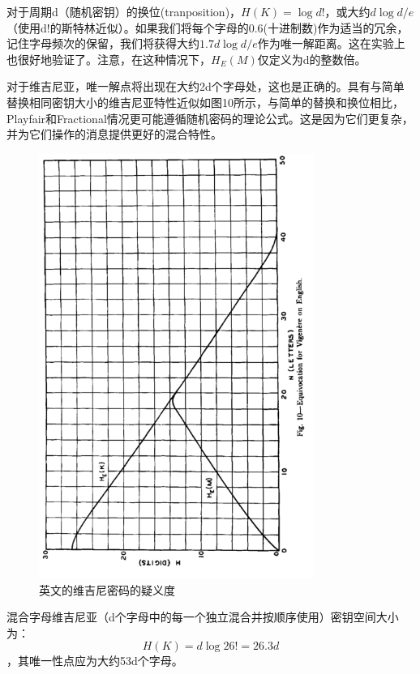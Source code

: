 \documentclass[]{article}
\begin{document}
对于周期d（随机密钥）的换位(tranposition)，$H(K)=\log{d!}$，或大约$d\log{d/e}$（使用d!的斯特林近似）。如果我们将每个字母的0.6(十进制数)作为适当的冗余，记住字母频次的保留，我们将获得大约$1.7d\log{d/e}$作为唯一解距离。这在实验上也很好地验证了。注意，在这种情况下，$H_E(M)$仅定义为d的整数倍。

对于维吉尼亚，唯一解点将出现在大约2d个字母处，这也是正确的。具有与简单替换相同密钥大小的维吉尼亚特性近似如图10所示，与简单的替换和换位相比，Playfair和Fractional情况更可能遵循随机密码的理论公式。这是因为它们更复杂，并为它们操作的消息提供更好的混合特性。

\begin{figure}[htbp]
	\centering
	\includegraphics[width=0.8\textwidth]{fig10.png}
	\caption{英文的维吉尼密码的疑义度}
	\label{fig:fig10}
\end{figure}

混合字母维吉尼亚（d个字母中的每一个独立混合并按顺序使用）密钥空间大小为：
\[H(K)=d\log{26!}=26.3d\]
，其唯一性点应为大约53d个字母。
\end{document}
